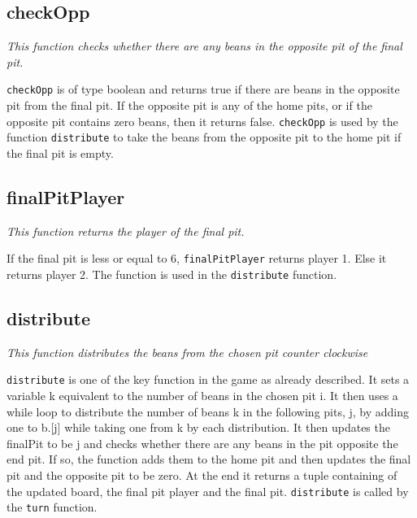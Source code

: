 \documentclass[a4paper]{report}
\begin{document}
\subsection*{checkOpp}
{\it This function checks whether there are any beans in the opposite pit of the final pit.}

\texttt{checkOpp} is of type boolean and returns true if there are beans in the opposite pit from the final pit. If the opposite pit is any of the home pits, or if the opposite pit contains zero beans, then it returns false. \texttt{checkOpp} is used by the function \texttt{distribute} to take the beans from the opposite pit to the home pit if the final pit is empty.

\subsection*{finalPitPlayer}
{\it This function returns the player of the final pit.}

If the final pit is less or equal to 6, \texttt{finalPitPlayer} returns player 1. Else it returns player 2. The function is used in the \texttt{distribute} function.

\subsection*{distribute}
{\it This function distributes the beans from the chosen pit counter clockwise}

\texttt{distribute} is one of the key function in the game as already described. It sets a variable k equivalent to the number of beans in the chosen pit i. It then uses a while loop to distribute the number of beans k in the following pits, j, by adding one to b.[j] while taking one from k by each distribution. It then updates the finalPit to be j and checks whether there are any beans in the pit opposite the end pit. If so, the function adds them to the home pit and then updates the final pit and the opposite pit to be zero. At the end it returns a tuple containing of the updated board, the final pit player and the final pit. \texttt{distribute} is called by the \texttt{turn} function.
\end{document}
